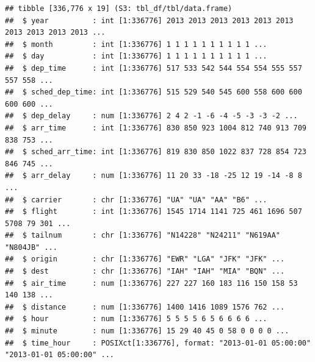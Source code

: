 \documentclass[
]{scrbook}
\newenvironment{Shaded}{\begin{snugshade}}{\end{snugshade}}
\newcommand{\AttributeTok}[1]{\textcolor[rgb]{0.77,0.63,0.00}{#1}}
\newcommand{\CommentTok}[1]{\textcolor[rgb]{0.56,0.35,0.01}{\textit{#1}}}
\newcommand{\DecValTok}[1]{\textcolor[rgb]{0.00,0.00,0.81}{#1}}
\newcommand{\FunctionTok}[1]{\textcolor[rgb]{0.00,0.00,0.00}{#1}}
\newcommand{\NormalTok}[1]{#1}
\newcommand{\OtherTok}[1]{\textcolor[rgb]{0.56,0.35,0.01}{#1}}
\newcommand{\SpecialCharTok}[1]{\textcolor[rgb]{0.00,0.00,0.00}{#1}}
\newcommand{\StringTok}[1]{\textcolor[rgb]{0.31,0.60,0.02}{#1}}
\renewenvironment{Shaded} {\begin{snugshade}\small} {\end{snugshade}}
\begin{document}
\begin{verbatim}
## tibble [336,776 x 19] (S3: tbl_df/tbl/data.frame)
##  $ year          : int [1:336776] 2013 2013 2013 2013 2013 2013 2013 2013 2013 2013 ...
##  $ month         : int [1:336776] 1 1 1 1 1 1 1 1 1 1 ...
##  $ day           : int [1:336776] 1 1 1 1 1 1 1 1 1 1 ...
##  $ dep_time      : int [1:336776] 517 533 542 544 554 554 555 557 557 558 ...
##  $ sched_dep_time: int [1:336776] 515 529 540 545 600 558 600 600 600 600 ...
##  $ dep_delay     : num [1:336776] 2 4 2 -1 -6 -4 -5 -3 -3 -2 ...
##  $ arr_time      : int [1:336776] 830 850 923 1004 812 740 913 709 838 753 ...
##  $ sched_arr_time: int [1:336776] 819 830 850 1022 837 728 854 723 846 745 ...
##  $ arr_delay     : num [1:336776] 11 20 33 -18 -25 12 19 -14 -8 8 ...
##  $ carrier       : chr [1:336776] "UA" "UA" "AA" "B6" ...
##  $ flight        : int [1:336776] 1545 1714 1141 725 461 1696 507 5708 79 301 ...
##  $ tailnum       : chr [1:336776] "N14228" "N24211" "N619AA" "N804JB" ...
##  $ origin        : chr [1:336776] "EWR" "LGA" "JFK" "JFK" ...
##  $ dest          : chr [1:336776] "IAH" "IAH" "MIA" "BQN" ...
##  $ air_time      : num [1:336776] 227 227 160 183 116 150 158 53 140 138 ...
##  $ distance      : num [1:336776] 1400 1416 1089 1576 762 ...
##  $ hour          : num [1:336776] 5 5 5 5 6 5 6 6 6 6 ...
##  $ minute        : num [1:336776] 15 29 40 45 0 58 0 0 0 0 ...
##  $ time_hour     : POSIXct[1:336776], format: "2013-01-01 05:00:00" "2013-01-01 05:00:00" ...
\end{verbatim}

\begin{Shaded}
\end{Shaded}
\end{document}

